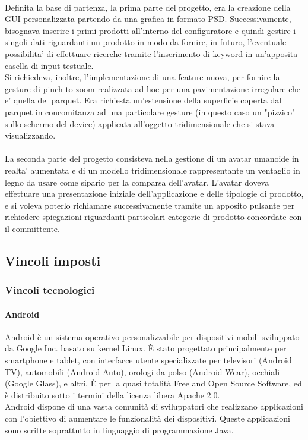 \\
Definita la base di partenza, la prima parte del progetto, era la creazione della GUI personalizzata partendo da una grafica in formato PSD. Successivamente, bisognava inserire i primi prodotti all'interno del configuratore e quindi gestire i singoli dati riguardanti un prodotto in modo da fornire, in futuro, l'eventuale possibilita' di effettuare ricerche tramite l'inserimento di keyword in un'apposita casella di input testuale.
\\
Si richiedeva, inoltre, l'implementazione di una feature nuova, per fornire la gesture di pinch-to-zoom realizzata ad-hoc per una pavimentazione irregolare che e' quella del parquet. Era richiesta un'estensione della superficie coperta dal parquet in concomitanza ad una particolare gesture (in questo caso un "pizzico" sullo schermo del device) applicata all'oggetto tridimensionale che si stava visualizzando.
\\
\\
La seconda parte del progetto consisteva nella gestione di un avatar umanoide in realta' aumentata e di un modello tridimensionale rappresentante un ventaglio in legno da usare come sipario per la comparsa dell'avatar. L'avatar doveva effettuare una presentazione iniziale dell'applicazione e delle tipologie di prodotto, e si voleva poterlo richiamare successivamente tramite un apposito pulsante per richiedere spiegazioni riguardanti particolari categorie di prodotto concordate con il committente.
\subsection{Vincoli imposti}
\subsubsection{Vincoli tecnologici}
\paragraph{Android}
Android è un sistema operativo personalizzabile per dispositivi mobili sviluppato da Google Inc. basato su kernel Linux.
È stato progettato principalmente per smartphone e tablet, con interfacce utente specializzate per televisori (Android TV), automobili (Android Auto), orologi da polso (Android Wear), occhiali (Google Glass), e altri.
È per la quasi totalità Free and Open Source Software, ed è distribuito sotto i termini della licenza libera Apache 2.0.\\
Android dispone di una vasta comunità di sviluppatori che realizzano applicazioni con l'obiettivo di aumentare le funzionalità dei dispositivi. Queste applicazioni sono scritte soprattutto in linguaggio di programmazione Java.

